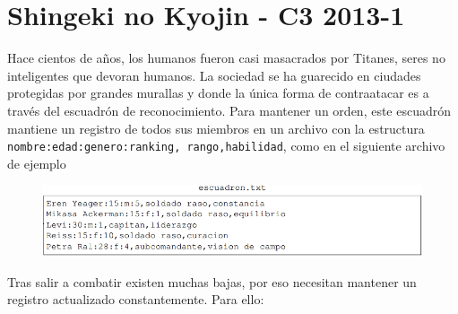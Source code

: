 \section{Shingeki no Kyojin - C3 2013-1}

Hace cientos de años, los humanos fueron casi masacrados por Titanes, seres no inteligentes que devoran humanos. La sociedad se ha guarecido en ciudades protegidas por grandes murallas y donde la única forma de contraatacar es a través del escuadrón de reconocimiento. Para mantener un orden, este escuadrón mantiene un registro de todos sus miembros en un archivo con la estructura \texttt{nombre:edad:genero:ranking, rango,habilidad}, como en el siguiente archivo de ejemplo

\begin{figure}[h]
    \centering
    \includegraphics[scale=0.8]{Imagenes/escuadron.png}
\end{figure}

Tras salir a combatir existen muchas bajas, por eso necesitan mantener un registro actualizado constantemente. Para ello:

